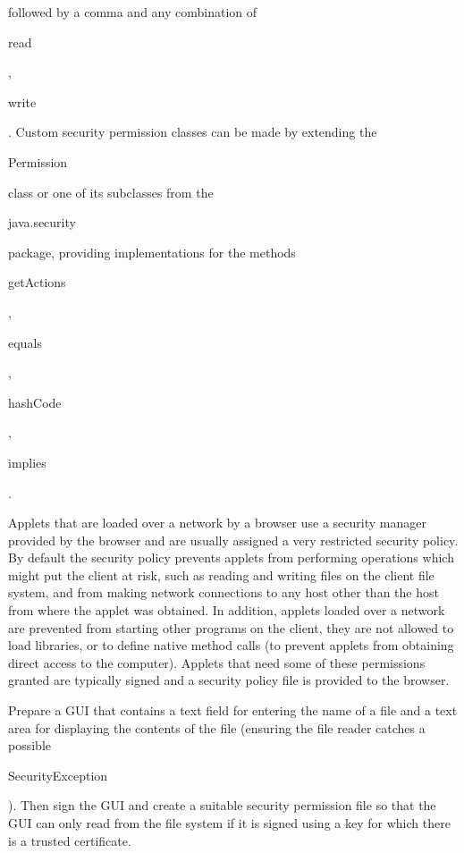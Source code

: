 followed by a comma and any combination of \begin{code}read\end{code},
\begin{code}write\end{code}.
Custom security permission classes can be made by extending the
\begin{code}Permission\end{code} class or one of its subclasses from the
\begin{code}java.security\end{code} package, providing implementations
for the methods \begin{code}getActions\end{code}, \begin{code}equals\end{code},
\begin{code}hashCode\end{code}, \begin{code}implies\end{code}.

Applets that are loaded over a network by a browser use a security manager provided
by the browser and are usually assigned a very restricted security policy.
By default the security policy prevents applets from performing operations
which might put the client at risk, such as reading and writing files
on the client file system, and from making network connections to any host other than
the host from where the applet was obtained.
In addition, applets loaded over a network are prevented from starting other programs
on the client, they are not allowed to load libraries,
or to define native method calls (to prevent applets from obtaining direct
access to the computer).
Applets that need some of these permissions granted are typically signed and a
security policy file is provided to the browser.


\begin{exercise}
Prepare a GUI that contains a text field for entering the name of a file
and a text area for displaying the contents of the file
(ensuring the file reader catches a possible \begin{code}Security\-Exception\end{code}).
Then sign the GUI and create a suitable security permission file so that the GUI
can only read from the file system if it is signed using a key for which there
is a trusted certificate.
\end{exercise}


